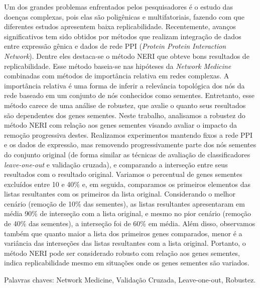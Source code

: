 \begin{resumo}

Um dos grandes problemas enfrentados pelos pesquisadores é o estudo das doenças complexas, pois elas são poligênicas e multifatoriais, fazendo com que diferentes estudos apresentem baixa replicabilidade.
Recentemente, avanços significativos tem sido obtidos por métodos que realizam integração de dados entre expressão gênica e dados de rede PPI (\textit{Protein Protein Interaction Network}).
Dentre eles destaca-se o método NERI que obteve bons resultados de replicabilidade.
Esse método baseia-se nas hipóteses da \textit{Network Medicine} combinadas com métodos de importância relativa em redes complexas.
A importância relativa é uma forma de inferir a relevância topológica dos nós da rede baseado em um conjunto de nós conhecidos como sementes. Entretanto, esse método carece de uma análise de robustez, que avalie o quanto seus resultados são dependentes dos genes sementes.
Neste trabalho, analisamos a robustez do método NERI com relação aos genes sementes visando avaliar o impacto da remoção progressiva destes.
Realizamos experimentos mantendo fixos a rede PPI e os dados de expressão, 
mas removendo progressivamente parte dos nós sementes do conjunto original (de forma similar as técnicas de avaliação de classificadores \textit{leave-one-out} e validação cruzada), e comparando a interseção entre seus resultados com o resultado original.
%
Variamos o percentual de genes sementes excluídos entre 10 e 40\% e, em seguida, comparamos os primeiros elementos das listas resultantes com os primeiros da lista original.
%
Considerando o melhor cenário (remoção de 10\% das sementes), as listas resultantes apresentaram em média 90\% de interseção com a lista original, e mesmo no pior cenário (remoção de 40\% das sementes), a interseção foi de 60\% em média.
Além disso, observamos também que quanto maior a lista dos primeiros genes comparados, menor é a variância das interseções das listas resultantes com a lista original.
%
Portanto, o método NERI pode ser considerado robusto com relação aos genes sementes, indica replicabilidade mesmo em situações onde os genes sementes são variados.


Palavras chaves: Network Medicine, Validação Cruzada, Leave-one-out, Robustez.
\end{resumo}

